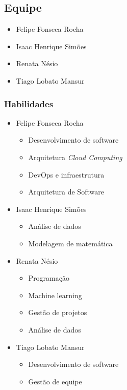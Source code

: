 \documentclass[journal]{IEEEtran}
\begin{document}
\subsection{Equipe}
\begin{itemize}
    \item Felipe Fonseca Rocha
    \item Isaac Henrique Simões
    \item Renata Nésio
    \item Tiago Lobato Mansur
\end{itemize}

\subsubsection{Habilidades}
\begin{itemize}
   \item Felipe Fonseca Rocha
   \begin{itemize}
     \item Desenvolvimento de software
     \item Arquitetura \textit{Cloud Computing}
     \item DevOps e infraestrutura
     \item Arquitetura de Software
   \end{itemize}

    \item Isaac Henrique Simões
    \begin{itemize}
        \item Análise de dados
        \item Modelagem de matemática
    \end{itemize}

    \item Renata Nésio
   \begin{itemize}
     \item Programação
     \item Machine learning 
     \item Gestão de projetos
     \item Análise de dados
   \end{itemize}

   \item Tiago Lobato Mansur
   \begin{itemize}
     \item Desenvolvimento de software
     \item Gestão de equipe
   \end{itemize}

\end{itemize}
\end{document}
